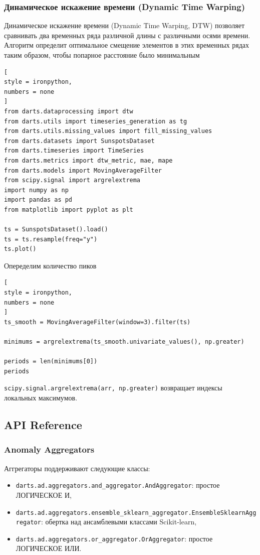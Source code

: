 \documentclass[%
	11pt,
	a4paper,
	utf8,
		]{article}
\begin{document}
\subsubsection{Динамическое искажение времени (Dynamic Time Warping)}

Динамическое искажение времени (Dynamic Time Warping, DTW) позволяет сравнивать два временных ряда различной длины с различными осями времени. Алгоритм определит оптимальное смещение элементов в этих временных рядах таким образом, чтобы попарное расстояние было минимальным
\begin{lstlisting}[
style = ironpython,
numbers = none
]
from darts.dataprocessing import dtw
from darts.utils import timeseries_generation as tg
from darts.utils.missing_values import fill_missing_values
from darts.datasets import SunspotsDataset
from darts.timeseries import TimeSeries
from darts.metrics import dtw_metric, mae, mape
from darts.models import MovingAverageFilter
from scipy.signal import argrelextrema
import numpy as np
import pandas as pd
from matplotlib import pyplot as plt

ts = SunspotsDataset().load()
ts = ts.resample(freq="y")
ts.plot()
\end{lstlisting}

Опеределим количество пиков
\begin{lstlisting}[
style = ironpython,
numbers = none	
]
ts_smooth = MovingAverageFilter(window=3).filter(ts)

minimums = argrelextrema(ts_smooth.univariate_values(), np.greater)

periods = len(minimums[0])
periods
\end{lstlisting}

\verb|scipy.signal.argrelextrema(arr, np.greater)| возвращает индексы локальных максимумов.

\subsection{API Reference}

\subsubsection{Anomaly Aggregators}

Аггрегаторы поддерживают следующие классы:
\begin{itemize}
	\item \verb|darts.ad.aggregators.and_aggregator.AndAggregator|: простое ЛОГИЧЕСКОЕ И,
	
	\item \verb|darts.ad.aggregators.ensemble_sklearn_aggregator.EnsembleSklearnAggregator|: обертка над ансамблевыми классами Scikit-learn,
	
	\item \verb|darts.ad.aggregators.or_aggregator.OrAggregator|: простое ЛОГИЧЕСКОЕ ИЛИ.
\end{itemize}
\end{document}
